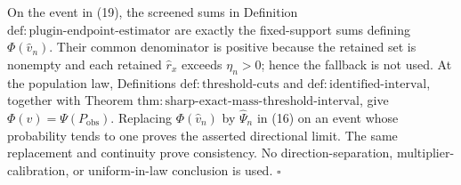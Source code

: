 On the event in (19), the screened sums in Definition
\(\mathrm{def{:}plugin\text{-}endpoint\text{-}estimator}\) are exactly
the fixed-support sums defining \(\Phi(\widehat v_n)\).  Their common
denominator is positive because the retained set is nonempty and each
retained \(\widehat r_x\) exceeds \(\eta_n>0\); hence the fallback is not
used.  At the population law, Definitions
\(\mathrm{def{:}threshold\text{-}cuts}\) and
\(\mathrm{def{:}identified\text{-}interval}\), together with Theorem
\(\mathrm{thm{:}sharp\text{-}exact\text{-}mass\text{-}threshold\text{-}interval}\),
give \(\Phi(v)=\Psi(P_{\mathrm{obs}})\).  Replacing
\(\Phi(\widehat v_n)\) by \(\widehat\Psi_n\) in (16) on an event whose
probability tends to one proves the asserted directional limit.  The same
replacement and continuity prove consistency.  No direction-separation,
multiplier-calibration, or uniform-in-law conclusion is used. \(\square\)
